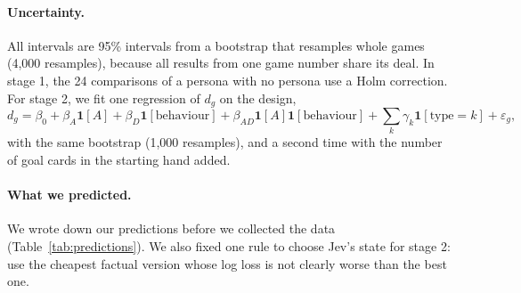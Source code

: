 \documentclass[10pt]{article}
\begin{document}
\paragraph{Uncertainty.} All intervals are 95\% intervals from a bootstrap that resamples whole games (4,000
resamples), because all results from one game number share its deal. In stage 1, the 24 comparisons of a persona with
no persona use a Holm correction. For stage 2, we fit one regression of $d_g$ on the design,
\[
  d_g = \beta_0 + \beta_A \mathbf{1}[A] + \beta_D \mathbf{1}[\text{behaviour}] + \beta_{AD}\mathbf{1}[A]\mathbf{1}[\text{behaviour}]
  + \textstyle\sum_k \gamma_k \mathbf{1}[\text{type}=k] + \varepsilon_g ,
\]
with the same bootstrap (1,000 resamples), and a second time with the number of goal cards in the starting hand added.

\paragraph{What we predicted.} We wrote down our predictions before we collected the data (Table~\ref{tab:predictions}).
We also fixed one rule to choose Jev's state for stage 2: use the cheapest factual version whose log loss is not
clearly worse than the best one.
\end{document}

